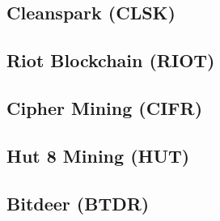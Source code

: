 \documentclass{article}
\begin{document}


\pagebreak

\subsection{Cleanspark (CLSK)}



\pagebreak

\subsection{Riot Blockchain (RIOT)}



\pagebreak

\subsection{Cipher Mining (CIFR)}



\pagebreak

\subsection{Hut 8 Mining (HUT)}



\pagebreak

\subsection{Bitdeer (BTDR)}


\end{document}
